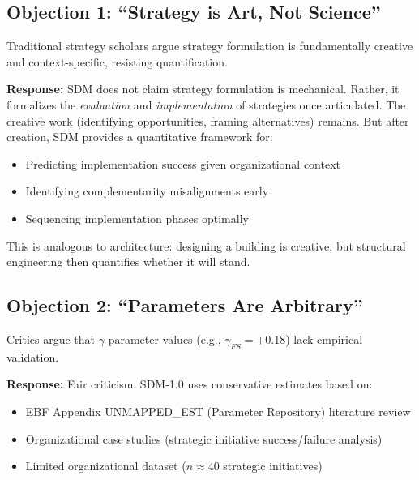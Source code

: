\subsection{Objection 1: ``Strategy is Art, Not Science''}

\begin{tcolorbox}[colback=red!5!white, colframe=red!50!black,
    title=Objection: Strategy Cannot Be Formalized]
Traditional strategy scholars argue strategy formulation is fundamentally creative and context-specific, resisting quantification.
\end{tcolorbox}

\textbf{Response:} SDM does not claim strategy formulation is mechanical. Rather, it formalizes the \textit{evaluation} and \textit{implementation} of strategies once articulated. The creative work (identifying opportunities, framing alternatives) remains. But after creation, SDM provides a quantitative framework for:
\begin{itemize}
    \item Predicting implementation success given organizational context
    \item Identifying complementarity misalignments early
    \item Sequencing implementation phases optimally
\end{itemize}

This is analogous to architecture: designing a building is creative, but structural engineering then quantifies whether it will stand.

\subsection{Objection 2: ``Parameters Are Arbitrary''}

\begin{tcolorbox}[colback=red!5!white, colframe=red!50!black,
    title=Objection: Complementarity Values ($\gamma$) Are Ad-hoc]
Critics argue that $\gamma$ parameter values (e.g., $\gamma_{FS} = +0.18$) lack empirical validation.
\end{tcolorbox}

\textbf{Response:} Fair criticism. SDM-1.0 uses conservative estimates based on:
\begin{itemize}
    \item EBF Appendix UNMAPPED_EST (Parameter Repository) literature review
    \item Organizational case studies (strategic initiative success/failure analysis)
    \item Limited organizational dataset ($n \approx 40$ strategic initiatives)
\end{itemize}


